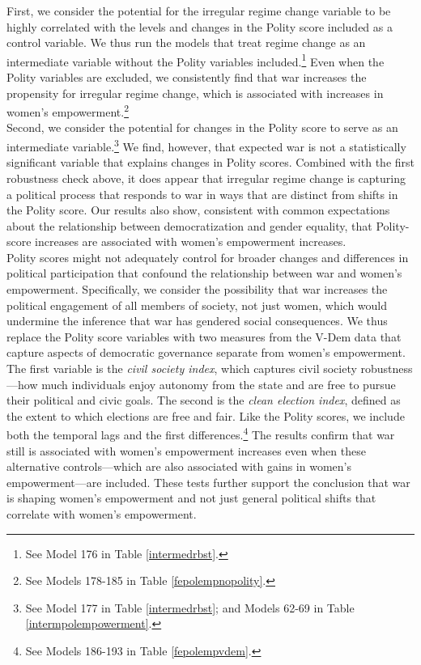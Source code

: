 First, we consider the potential for the irregular regime change variable to be highly correlated with the levels and changes in the Polity score included as a control variable. We thus run the models that treat regime change as an intermediate variable without the Polity variables included.\footnote{See Model 176 in Table \ref{intermedrbst}.}  Even when the Polity variables are excluded, we consistently find that war increases the propensity for irregular regime change, which is associated with increases in women's empowerment.\footnote{See Models 178-185 in Table \ref{fepolempnopolity}.} \\

Second, we consider the potential for changes in the Polity score to serve as an intermediate variable.\footnote{See Model 177 in Table \ref{intermedrbst}; and Models 62-69 in Table \ref{intermpolempowerment}.} We find, however, that expected war is not a statistically significant variable that explains changes in Polity scores. Combined with the first robustness check above, it does appear that irregular regime change is capturing a political process that responds to war in ways that are distinct from shifts in the Polity score. Our results also show, consistent with common expectations about the relationship between democratization and gender equality, that Polity-score increases are associated with women's empowerment increases.\\


Polity scores might not adequately control for broader changes and differences in political participation that confound the relationship between war and women's empowerment. Specifically, we consider the possibility that war increases the political engagement of all members of society, not just women, which would undermine the inference that war has gendered social consequences. We thus replace the Polity score variables with two measures from the V-Dem data that capture aspects of democratic governance separate from women's empowerment. The first variable is the {\it civil society index}, which captures civil society robustness---how much individuals enjoy autonomy from the state and are free to pursue their political and civic goals. The second is the {\it clean election index}, defined as the extent to which elections are free and fair. Like the Polity scores, we include both the temporal lags and the first differences.\footnote{See Models 186-193 in Table \ref{fepolempvdem}.} The results confirm that war still is associated with women's empowerment increases even when these alternative controls---which are also associated with gains in women's empowerment---are included. These tests further support the conclusion that war is shaping women's empowerment and not just general political shifts that correlate with women's empowerment.\\



